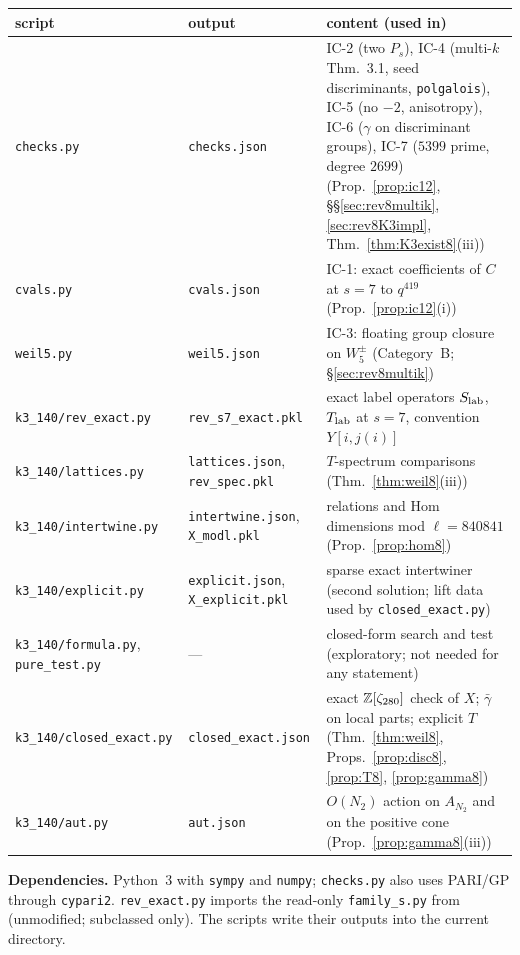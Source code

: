 \begin{center}\small
\begin{longtable}{p{4.1cm}p{3.9cm}p{6.5cm}}\toprule
script & output & content (used in)\\\midrule\endhead
\texttt{checks.py} & \texttt{checks.json} & IC-2 (two $P_s$), IC-4 (multi-$k$ Thm.~3.1, seed discriminants, \texttt{polgalois}), IC-5 (no $-2$, anisotropy), IC-6 ($\gamma$ on discriminant groups), IC-7 ($5399$ prime, degree $2699$) (Prop.~\ref{prop:ic12}, \S\S\ref{sec:rev8multik}, \ref{sec:rev8K3impl}, Thm.~\ref{thm:K3exist8}(iii))\\
\texttt{cvals.py} & \texttt{cvals.json} & IC-1: exact coefficients of $C$ at $s=7$ to $q^{419}$ (Prop.~\ref{prop:ic12}(i))\\
\texttt{weil5.py} & \texttt{weil5.json} & IC-3: floating group closure on $W_5^\pm$ (Category~B; \S\ref{sec:rev8multik})\\
\texttt{k3\_140/rev\_exact.py} & \texttt{rev\_s7\_exact.pkl} & exact label operators $S_{\rm lab}$, $T_{\rm lab}$ at $s=7$, convention $Y[i,j(i)]$\\
\texttt{k3\_140/lattices.py} & \texttt{lattices.json}, \texttt{rev\_spec.pkl} & $T$-spectrum comparisons (Thm.~\ref{thm:weil8}(iii))\\
\texttt{k3\_140/intertwine.py} & \texttt{intertwine.json}, \texttt{X\_modl.pkl} & relations and Hom dimensions mod $\ell=840841$ (Prop.~\ref{prop:hom8})\\
\texttt{k3\_140/explicit.py} & \texttt{explicit.json}, \texttt{X\_explicit.pkl} & sparse exact intertwiner (second solution; lift data used by \texttt{closed\_exact.py})\\
\texttt{k3\_140/formula.py}, \texttt{pure\_test.py} & --- & closed-form search and test (exploratory; not needed for any statement)\\
\texttt{k3\_140/closed\_exact.py} & \texttt{closed\_exact.json} & exact $\mathbb{Z}[\zeta_{280}]$ check of $X$; $\bar\gamma$ on local parts; explicit $T$ (Thm.~\ref{thm:weil8}, Props.~\ref{prop:disc8}, \ref{prop:T8}, \ref{prop:gamma8})\\
\texttt{k3\_140/aut.py} & \texttt{aut.json} & $O(N_2)$ action on $A_{N_2}$ and on the positive cone (Prop.~\ref{prop:gamma8}(iii))\\\bottomrule
\end{longtable}
\end{center}
\textbf{Dependencies.} Python~3 with \texttt{sympy} and \texttt{numpy}; \texttt{checks.py} also uses PARI/GP through \texttt{cypari2}. \texttt{rev\_exact.py} imports the read-only \texttt{family\_s.py} from  (unmodified; subclassed only). The scripts write their outputs into the current directory.

